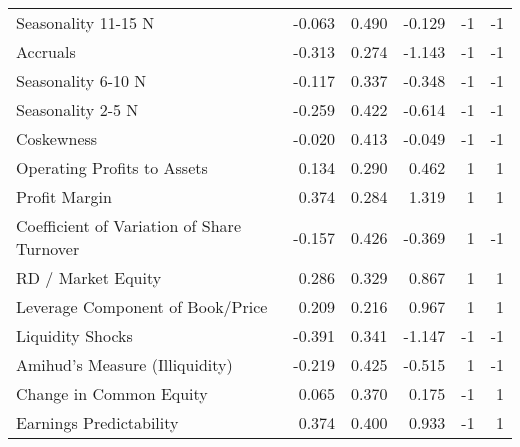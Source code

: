 \begin{tabular}{lrrrrr}
Seasonality 11-15 N                        & -0.063 &  0.490 &      -0.129 &               -1 &           -1 \\
Accruals                                   & -0.313 &  0.274 &      -1.143 &               -1 &           -1 \\
Seasonality 6-10 N                         & -0.117 &  0.337 &      -0.348 &               -1 &           -1 \\
Seasonality 2-5 N                          & -0.259 &  0.422 &      -0.614 &               -1 &           -1 \\
Coskewness                                 & -0.020 &  0.413 &      -0.049 &               -1 &           -1 \\
Operating Profits to Assets                &  0.134 &  0.290 &       0.462 &                1 &            1 \\
Profit Margin                              &  0.374 &  0.284 &       1.319 &                1 &            1 \\
Coefficient of Variation of Share Turnover & -0.157 &  0.426 &      -0.369 &                1 &           -1 \\
RD / Market Equity                         &  0.286 &  0.329 &       0.867 &                1 &            1 \\
Leverage Component of Book/Price           &  0.209 &  0.216 &       0.967 &                1 &            1 \\
Liquidity Shocks                           & -0.391 &  0.341 &      -1.147 &               -1 &           -1 \\
Amihud's Measure (Illiquidity)             & -0.219 &  0.425 &      -0.515 &                1 &           -1 \\
Change in Common Equity                    &  0.065 &  0.370 &       0.175 &               -1 &            1 \\
Earnings Predictability                    &  0.374 &  0.400 &       0.933 &               -1 &            1 \\
\bottomrule
\end{tabular}
